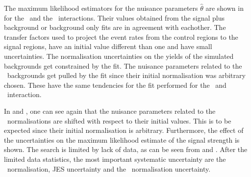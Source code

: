 The maximum likelihood estimators for the nuisance parameters $\hat{\theta}$ are shown in  for the \Zct\ and the \Zut\ interactions. Their values obtained from the signal plus background or background only fits are in agreement with eachother. The transfer factors used to project the event rates from the control regions to the signal regions, have an initial value different than one and have small uncertainties. The normalisation uncertainties on the yields of the simulated backgrounds get constrained by the fit. The nuisance parameters related to the \NPL\ backgrounds get pulled by the fit since their initial normalisation was arbitrary chosen. These have the same tendencies for the fit performed for the \Zut\ and \Zct\ interaction.  %

 In  and , one can see again that the nuisance parameters related to the \NPL\ normalisations are shifted with respect to their initial values. This is to be expected since their initial  normalisation is arbitrary. Furthermore, the effect of the uncertainties on the maximum likelihood estimate of the signal strength is shown. The search is limited by lack of data, as can be seen from  and . After the limited data statistics, the most important systematic uncertainty are the \ttZ\ normalisation, JES uncertainty and the \NPL\ normalisation uncertainty. 
 
 

